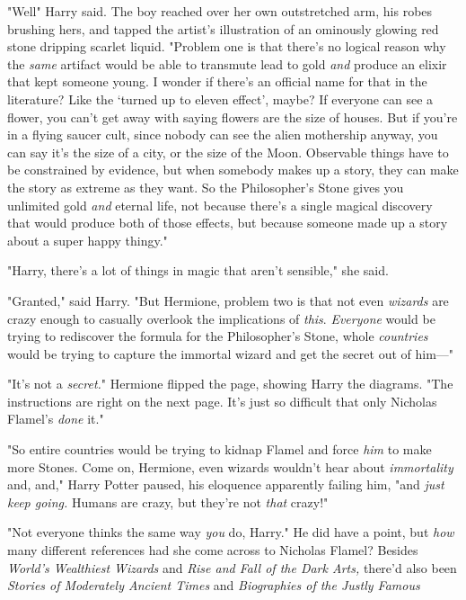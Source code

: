 "Well{\el}" Harry said. The boy reached over her own outstretched arm, his
robes brushing hers, and tapped the artist's illustration of an ominously
glowing red stone dripping scarlet liquid. "Problem one is that there's no
logical reason why the \emph{same} artifact would be able to transmute lead to
gold \emph{and} produce an elixir that kept someone young. I wonder if there's
an official name for that in the literature? Like the `turned up to eleven
effect', maybe? If everyone can see a flower, you can't get away with saying
flowers are the size of houses. But if you're in a flying saucer cult, since
nobody can see the alien mothership anyway, you can say it's the size of a
city, or the size of the Moon. Observable things have to be constrained by
evidence, but when somebody makes up a story, they can make the story as
extreme as they want. So the Philosopher's Stone gives you unlimited gold
\emph{and} eternal life, not because there's a single magical discovery that
would produce both of those effects, but because someone made up a story about
a super happy thingy."

"Harry, there's a lot of things in magic that aren't sensible," she said.

"Granted," said Harry. "But Hermione, problem two is that not even
\emph{wizards} are crazy enough to casually overlook the implications of
\emph{this}. \emph{Everyone} would be trying to rediscover the formula for the
Philosopher's Stone, whole \emph{countries} would be trying to capture the
immortal wizard and get the secret out of him\mbox{---}"

"It's not a \emph{secret.}" Hermione flipped the page, showing Harry the
diagrams. "The instructions are right on the next page. It's just so difficult
that only Nicholas Flamel's \emph{done} it."

"So entire countries would be trying to kidnap Flamel and force \emph{him} to
make more Stones. Come on, Hermione, even wizards wouldn't hear about
\emph{immortality} and, and," Harry Potter paused, his eloquence apparently
failing him, "and \emph{just keep going.} Humans are crazy, but they're not
\emph{that} crazy!"

"Not everyone thinks the same way \emph{you} do, Harry." He did have a point,
but{\el} \emph{how} many different references had she come across to
Nicholas Flamel? Besides \emph{World's Wealthiest Wizards} and \emph{Rise and
Fall of the Dark Arts,} there'd also been \emph{Stories of Moderately Ancient
Times} and \emph{Biographies of the Justly Famous{\el}}

